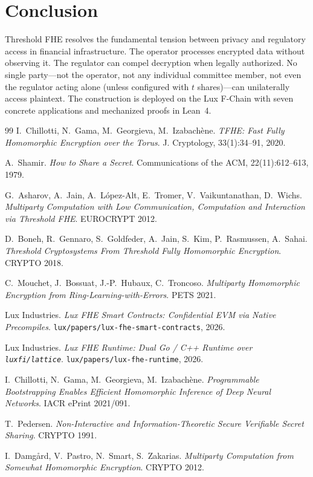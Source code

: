 \section{Conclusion}

\label{sec:conclusion}

Threshold FHE resolves the fundamental tension between privacy and
regulatory access in financial infrastructure.  The operator processes
encrypted data without observing it.  The regulator can compel
decryption when legally authorized.  No single party---not the operator,
not any individual committee member, not even the regulator acting
alone (unless configured with $t$ shares)---can unilaterally access
plaintext.  The construction is deployed on the Lux F-Chain with
seven concrete applications and mechanized proofs in Lean~4.

\begin{thebibliography}{99}
I.~Chillotti, N.~Gama, M.~Georgieva, M.~Izabach\`{e}ne.
\emph{TFHE: Fast Fully Homomorphic Encryption over the Torus}.
J. Cryptology, 33(1):34--91, 2020.

A.~Shamir.
\emph{How to Share a Secret}.
Communications of the ACM, 22(11):612--613, 1979.

G.~Asharov, A.~Jain, A.~L\'{o}pez-Alt, E.~Tromer, V.~Vaikuntanathan, D.~Wichs.
\emph{Multiparty Computation with Low Communication, Computation and Interaction via Threshold FHE}.
EUROCRYPT 2012.

D.~Boneh, R.~Gennaro, S.~Goldfeder, A.~Jain, S.~Kim, P.~Rasmussen, A.~Sahai.
\emph{Threshold Cryptosystems From Threshold Fully Homomorphic Encryption}.
CRYPTO 2018.

C.~Mouchet, J.~Bossuat, J.-P.~Hubaux, C.~Troncoso.
\emph{Multiparty Homomorphic Encryption from Ring-Learning-with-Errors}.
PETS 2021.

Lux Industries.
\emph{Lux FHE Smart Contracts: Confidential EVM via Native Precompiles}.
\texttt{lux/papers/lux-fhe-smart-contracts}, 2026.

Lux Industries.
\emph{Lux FHE Runtime: Dual Go / C++ Runtime over \texttt{luxfi/lattice}}.
\texttt{lux/papers/lux-fhe-runtime}, 2026.

I.~Chillotti, N.~Gama, M.~Georgieva, M.~Izabach\`{e}ne.
\emph{Programmable Bootstrapping Enables Efficient Homomorphic Inference of Deep Neural Networks}.
IACR ePrint 2021/091.

T.~Pedersen.
\emph{Non-Interactive and Information-Theoretic Secure Verifiable Secret Sharing}.
CRYPTO 1991.

I.~Damg\r{a}rd, V.~Pastro, N.~Smart, S.~Zakarias.
\emph{Multiparty Computation from Somewhat Homomorphic Encryption}.
CRYPTO 2012.
\end{thebibliography}

